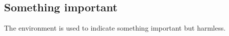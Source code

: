 \documentclass[10pt, a4paper]{article}
\begin{document}
\subsection{Something important}

The  environment is used to indicate something important but harmless.

\end{document}
